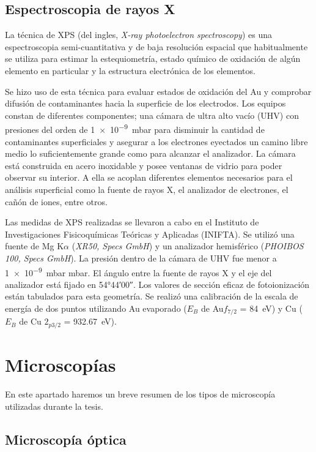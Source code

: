 	\subsection{Espectroscopia de rayos X}

		La técnica de XPS (del ingles, \textit {X-ray photoelectron spectroscopy}) es una espectroscopia semi-cuantitativa y de baja resolución espacial que habitualmente se utiliza para estimar la estequiometría, estado químico de oxidación de algún elemento en particular y la estructura electrónica de los elementos.

		Se hizo uso de esta técnica para evaluar estados de oxidación del Au y comprobar difusión de contaminantes hacia la superficie de los electrodos.  Los equipos constan de diferentes componentes; una cámara de ultra alto vacío (UHV) con presiones del orden de \SI{1e-9}{mbar} para disminuir la cantidad de contaminantes superficiales y asegurar a los electrones eyectados un camino libre medio lo suficientemente grande como para alcanzar el analizador. La cámara está construida en acero inoxidable y posee ventanas de vidrio para poder observar su interior. A ella se acoplan diferentes elementos necesarios para el análisis superficial como la fuente de rayos X, el analizador de electrones, el cañón de iones, entre otros.\cite{XPS1978,Corthey2012}

		Las medidas de XPS realizadas se llevaron a cabo en el Instituto de Investigaciones Fisicoquímicas Teóricas y Aplicadas (INIFTA). Se utilizó una fuente de Mg K$\alpha$ (\textit{XR50, Specs GmbH}) y un analizador hemisférico (\textit{PHOIBOS 100, Specs GmbH}). La presión dentro de la cámara de UHV fue menor a \SI{1e-9}{mbar} mbar. El ángulo entre la fuente de rayos X y el eje del analizador está fijado en \ang{54;44;00}. Los valores de sección eficaz de fotoionización están tabulados para esta geometría. Se realizó una calibración de la escala de energía de dos puntos utilizando Au evaporado ($E_B$ de Au$f_{7/2}$ = \SI{84}{\electronvolt}) y Cu ($E_B$ de Cu $2_{p3/2}$ = \SI{932.67}{\electronvolt}).
		
\section{Microscopías}
		
	En este apartado haremos un breve resumen de los tipos de microscopía utilizadas durante la tesis.

	\subsection{Microscopía óptica}

